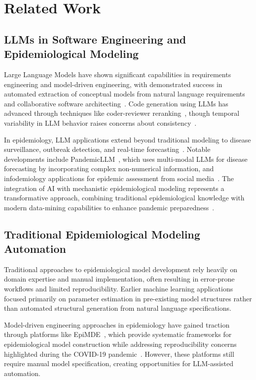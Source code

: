 \documentclass[conference]{IEEEtran}
\begin{document}
\section{Related Work}

\subsection{LLMs in Software Engineering and Epidemiological Modeling}

Large Language Models have shown significant capabilities in requirements engineering and model-driven engineering, with demonstrated success in automated extraction of conceptual models from natural language requirements~\cite{b7} and collaborative software architecting~\cite{b8}. Code generation using LLMs has advanced through techniques like coder-reviewer reranking~\cite{b9}, though temporal variability in LLM behavior raises concerns about consistency~\cite{b10,b11}.

In epidemiology, LLM applications extend beyond traditional modeling to disease surveillance, outbreak detection, and real-time forecasting~\cite{b12}. Notable developments include PandemicLLM~\cite{b14}, which uses multi-modal LLMs for disease forecasting by incorporating complex non-numerical information, and infodemiology applications for epidemic assessment from social media~\cite{b15,b16}. The integration of AI with mechanistic epidemiological modeling represents a transformative approach, combining traditional epidemiological knowledge with modern data-mining capabilities to enhance pandemic preparedness~\cite{b17}.

\subsection{Traditional Epidemiological Modeling Automation}

Traditional approaches to epidemiological model development rely heavily on domain expertise and manual implementation, often resulting in error-prone workflows and limited reproducibility. Earlier machine learning applications focused primarily on parameter estimation in pre-existing model structures rather than automated structural generation from natural language specifications.

Model-driven engineering approaches in epidemiology have gained traction through platforms like EpiMDE~\cite{b1}, which provide systematic frameworks for epidemiological model construction while addressing reproducibility concerns highlighted during the COVID-19 pandemic~\cite{b3}. However, these platforms still require manual model specification, creating opportunities for LLM-assisted automation.
\end{document}
